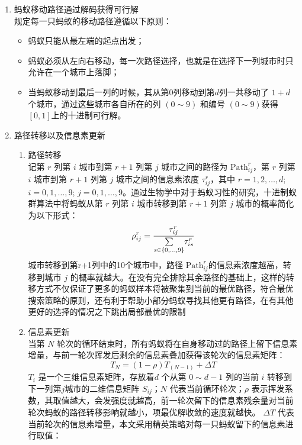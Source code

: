 \documentclass[../main.tex]{subfiles}
\begin{document}
\begin{enumerate}
\item 蚂蚁移动路径通过解码获得可行解\\
规定每一只蚂蚁的移动路径遵循以下原则：
\begin{itemize}
\item 蚂蚁只能从最左端的起点出发；
\item 蚂蚁必须从左向右移动，每一次路径选择，也就是在选择下一列城市时只允许在一个城市上落脚；
\item 当蚂蚁移动到最后一列的时候，其从第0列移动到第\(d\)列一共移动了 \(1 + d\) 个城市，通过这些城市各自所在的列 \((0 {\sim} 9)\) 和编号 \(( 0 {\sim} 9)\)获得 \([0,1]\)上的十进制可行解。
\end{itemize}
%
\item 路径转移以及信息素更新
\begin{enumerate}
\item 路径转移\\
记第 \(r\) 列第 \(i\) 城市到第 \(r+ 1\) 列第 \(j\) 城市之间的路径为 \(\mathrm{Path} _{ij} ^{r}\)，第 \(r\) 列第 \(i\) 城市到第 \(r+ 1\) 列第 \(j\) 城市之间的信息素浓度 \(\tau ^{r} _{ij}\)，其中 \(r = 1, 2, \dots , d\); \(i = 0, 1 , \dots , 9\); \(j = 0 , 1 , \dots , 9\)。通过生物学中对于蚂蚁习性的研究，十进制蚁群算法中将蚂蚁从第 \(r\) 列第 \(i\) 城市转移到第 \(r+1\) 列第 \(j\) 城市的概率简化为以下形式：
\begin{equation}\label{equ:pass1}
\rho _{ij} ^{r} = \frac{\tau ^{r} _{ij}}{\sum\limits_{s\in \{0 , \dots , 9\}} \kern -2pt\tau ^{r} _{is}}
\end{equation}
城市转移到第r+1列中的10个城市中，路径 \(\mathrm{Path}_{ij} ^{r}\)的信息素浓度越高，转移到城市 \(j\) 的概率就越大。在没有完全排除其余路径的基础上，这样的转移方式不仅保证了更多的蚂蚁样本将被聚集到当前的最优路径，符合最优搜索策略的原则，还有利于帮助小部分蚂蚁寻找其他更有路径，在有其他更好的选择的情况之下跳出局部最优的限制
\item 信息素更新\\
当第 \(N\) 轮次的循环结束时，所有蚂蚁将在自身移动过的路径上留下信息素增量，与前一轮次挥发后剩余的信息素叠加获得该轮次的信息素矩阵：
\begin{equation}\label{equ:shit}
T_{N} = (1 - \rho) T _{(N- 1)} + \Delta T
\end{equation}
\(T_{i}\) 是一个三维信息素矩阵，存放着\(d\) 个从第 \(0{\sim} d -1\) 列的当前 \(i\) 转移到下一列第\(j\)城市的二维信息矩阵 \(S_{ij}\)；\(N\) 代表当前循环轮次；\(\rho\) 表示挥发系数，其取值越大，会发强度就越高，前一轮次留下的信息素残余量对当前轮次蚂蚁的路径转移影响就越小，项最优解收敛的速度就越快。
\(\Delta T\) 代表当前轮次的信息素增量，本文采用精英策略对每一只蚂蚁留下的信息素进行取值： 


\end{enumerate}
\end{enumerate}
\end{document}
